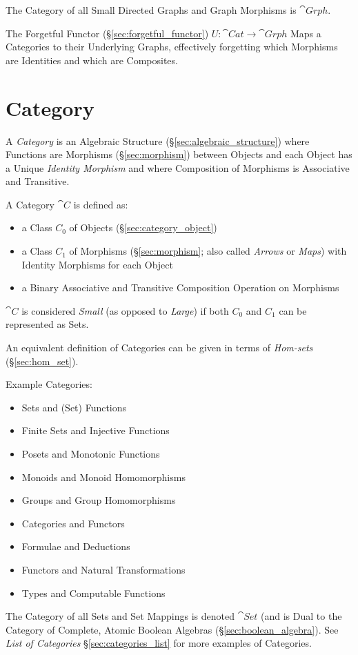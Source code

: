 The Category of all Small Directed Graphs and Graph Morphisms is
$\cat{Grph}$.

The Forgetful Functor (\S\ref{sec:forgetful_functor}) $U : \cat{Cat}
\rightarrow \cat{Grph}$ Maps a Categories to their Underlying Graphs,
effectively forgetting which Morphisms are Identities and which are
Composites.



\section{Category}\label{sec:category}

A \emph{Category} is an Algebraic Structure
(\S\ref{sec:algebraic_structure}) where Functions are Morphisms
(\S\ref{sec:morphism}) between Objects and each Object has a Unique
\emph{Identity Morphism} and where Composition of Morphisms is
Associative and Transitive.

A Category $\cat{C}$ is defined as:
\begin{itemize}
\item a Class $C_0$ of Objects (\S\ref{sec:category_object})
\item a Class $C_1$ of Morphisms (\S\ref{sec:morphism}; also called
  \emph{Arrows} or \emph{Maps}) with Identity Morphisms for each
  Object
\item a Binary Associative and Transitive Composition Operation on
  Morphisms
\end{itemize}
$\cat{C}$ is considered \emph{Small} (as opposed to \emph{Large})
if both $C_0$ and $C_1$ can be represented as Sets.

An equivalent definition of Categories can be given in terms of
\emph{Hom-sets} (\S\ref{sec:hom_set}).

Example Categories:
\begin{itemize}
\item Sets and (Set) Functions
\item Finite Sets and Injective Functions
\item Posets and Monotonic Functions
\item Monoids and Monoid Homomorphisms
\item Groups and Group Homomorphisms
\item Categories and Functors
\item Formulae and Deductions
\item Functors and Natural Transformations
\item Types and Computable Functions
\end{itemize}
The Category of all Sets and Set Mappings is denoted $\cat{Set}$
(and is Dual to the Category of Complete, Atomic Boolean Algebras
(\S\ref{sec:boolean_algebra}). See \emph{List of Categories}
\S\ref{sec:categories_list} for more examples of Categories.

